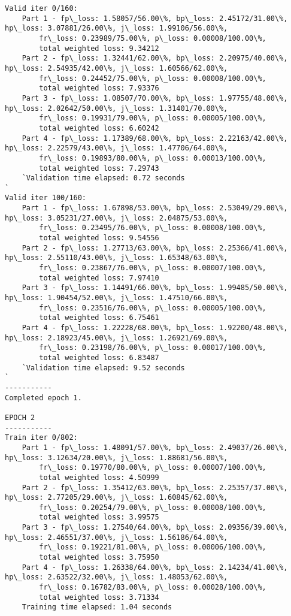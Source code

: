 \documentclass[11pt]{article}
\begin{document}
\begin{Verbatim}[commandchars=\\\{\}]
Valid iter 0/160:
	Part 1 - fp\_loss: 1.58057/56.00\%, bp\_loss: 2.45172/31.00\%, hp\_loss: 3.07881/26.00\%, j\_loss: 1.99106/56.00\%, 
		fr\_loss: 0.23989/75.00\%, p\_loss: 0.00008/100.00\%, 
		total weighted loss: 9.34212
	Part 2 - fp\_loss: 1.32441/62.00\%, bp\_loss: 2.20975/40.00\%, hp\_loss: 2.54935/42.00\%, j\_loss: 1.60566/62.00\%, 
		fr\_loss: 0.24452/75.00\%, p\_loss: 0.00008/100.00\%, 
		total weighted loss: 7.93376
	Part 3 - fp\_loss: 1.08507/70.00\%, bp\_loss: 1.97755/48.00\%, hp\_loss: 2.02642/50.00\%, j\_loss: 1.31401/70.00\%, 
		fr\_loss: 0.19931/79.00\%, p\_loss: 0.00005/100.00\%, 
		total weighted loss: 6.60242
	Part 4 - fp\_loss: 1.17389/68.00\%, bp\_loss: 2.22163/42.00\%, hp\_loss: 2.22579/43.00\%, j\_loss: 1.47706/64.00\%, 
		fr\_loss: 0.19893/80.00\%, p\_loss: 0.00013/100.00\%, 
		total weighted loss: 7.29743
	`Validation time elapsed: 0.72 seconds
`
Valid iter 100/160:
	Part 1 - fp\_loss: 1.67898/53.00\%, bp\_loss: 2.53049/29.00\%, hp\_loss: 3.05231/27.00\%, j\_loss: 2.04875/53.00\%, 
		fr\_loss: 0.23495/76.00\%, p\_loss: 0.00008/100.00\%, 
		total weighted loss: 9.54556
	Part 2 - fp\_loss: 1.27713/63.00\%, bp\_loss: 2.25366/41.00\%, hp\_loss: 2.55110/43.00\%, j\_loss: 1.65348/63.00\%, 
		fr\_loss: 0.23867/76.00\%, p\_loss: 0.00007/100.00\%, 
		total weighted loss: 7.97410
	Part 3 - fp\_loss: 1.14491/66.00\%, bp\_loss: 1.99485/50.00\%, hp\_loss: 1.90454/52.00\%, j\_loss: 1.47510/66.00\%, 
		fr\_loss: 0.23516/76.00\%, p\_loss: 0.00005/100.00\%, 
		total weighted loss: 6.75461
	Part 4 - fp\_loss: 1.22228/68.00\%, bp\_loss: 1.92200/48.00\%, hp\_loss: 2.18923/45.00\%, j\_loss: 1.26921/69.00\%, 
		fr\_loss: 0.23198/76.00\%, p\_loss: 0.00017/100.00\%, 
		total weighted loss: 6.83487
	`Validation time elapsed: 9.52 seconds
`
-----------
Completed epoch 1.

EPOCH 2
-----------
Train iter 0/802:
	Part 1 - fp\_loss: 1.48091/57.00\%, bp\_loss: 2.49037/26.00\%, hp\_loss: 3.12634/20.00\%, j\_loss: 1.88681/56.00\%, 
		fr\_loss: 0.19770/80.00\%, p\_loss: 0.00007/100.00\%, 
		total weighted loss: 4.50999
	Part 2 - fp\_loss: 1.35412/63.00\%, bp\_loss: 2.25357/37.00\%, hp\_loss: 2.77205/29.00\%, j\_loss: 1.60845/62.00\%, 
		fr\_loss: 0.20254/79.00\%, p\_loss: 0.00008/100.00\%, 
		total weighted loss: 3.99575
	Part 3 - fp\_loss: 1.27540/64.00\%, bp\_loss: 2.09356/39.00\%, hp\_loss: 2.46551/37.00\%, j\_loss: 1.56186/64.00\%, 
		fr\_loss: 0.19221/81.00\%, p\_loss: 0.00006/100.00\%, 
		total weighted loss: 3.75950
	Part 4 - fp\_loss: 1.26338/64.00\%, bp\_loss: 2.14234/41.00\%, hp\_loss: 2.63522/32.00\%, j\_loss: 1.48053/62.00\%, 
		fr\_loss: 0.16782/83.00\%, p\_loss: 0.00028/100.00\%, 
		total weighted loss: 3.71334
	Training time elapsed: 1.04 seconds


\end{Verbatim}
\end{document}
